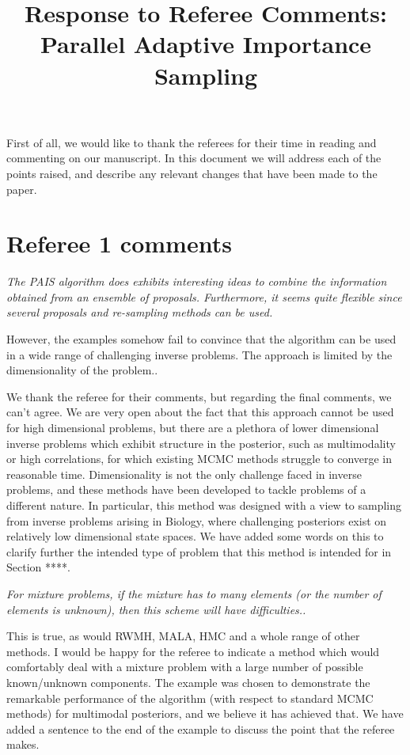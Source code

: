 \documentclass{article}
\newcommand{\comment}[2]{\vspace{0.6cm}{\bf Comment:} {\it #1.}

\vspace{0.3cm}{\bf Answer:} #2}
\begin{document}
\title{Response to Referee Comments: Parallel Adaptive Importance Sampling}
\maketitle
First of all, we would like to thank the referees for
their time in reading and commenting on our manuscript. In this document
we will address each of the points raised, and describe any relevant
changes that have been made to the paper.

\section*{Referee 1 comments}

\comment{The PAIS algorithm does exhibits interesting ideas to combine the information 
obtained from an ensemble of proposals. Furthermore, it seems quite flexible 
since several proposals and re-sampling methods can be used.

However, the examples somehow fail to convince that the algorithm can be used 
in a wide range of challenging inverse problems. The approach is limited by the 
dimensionality of the problem.}{We thank the referee for their comments, but regarding the final comments, we can't agree. We are very open about the fact that this approach cannot be used for high dimensional problems, but there are a plethora of lower dimensional inverse problems which exhibit structure in the posterior, such as multimodality or high correlations, for which existing MCMC methods struggle to converge in reasonable time. Dimensionality is not the only challenge faced in inverse problems, and these methods have been developed to tackle problems of a different nature. In particular, this method was designed with a view to sampling from inverse problems arising in Biology, where challenging posteriors exist on relatively low dimensional state spaces. We have added some words on this to clarify further the intended type of problem that this method is intended for in Section ****.}

\comment{For mixture problems, if the mixture has to many 
elements (or the number of elements is unknown), then this scheme will have 
difficulties.}{This is true, as would RWMH, MALA, HMC and a whole range of other methods. I would be happy for the referee to indicate a method which would comfortably deal with a mixture problem with a large number of possible known/unknown components. The example was chosen to demonstrate the remarkable performance of the algorithm (with respect to standard MCMC methods) for multimodal posteriors, and we believe it has achieved that. We have added a sentence to the end of the example to discuss the point that the referee makes.}
\end{document}
